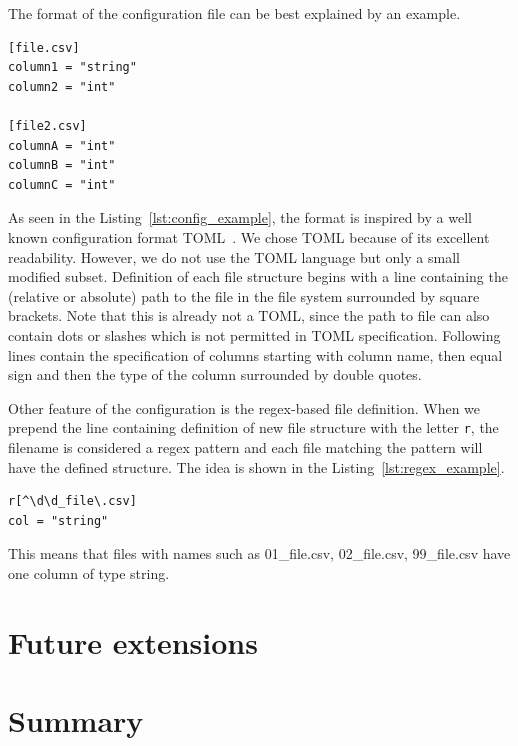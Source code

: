 The format of the configuration file can be best explained by an example.

\begin{lstlisting}[caption=An example configuration file, label={lst:config_example}, captionpos=b]
[file.csv]
column1 = "string"
column2 = "int"

[file2.csv]
columnA = "int"
columnB = "int"
columnC = "int"
\end{lstlisting}

As seen in the Listing~\ref{lst:config_example}, the format is inspired by a well known configuration format
TOML~\cite{toml_spec}.
We chose TOML because of its excellent readability.
However, we do not use the TOML language but only a small modified subset.
Definition of each file structure begins with a line containing the (relative or absolute) path to the file in the file
system surrounded by square brackets.
Note that this is already not a TOML, since the path to file can also contain dots or slashes which is not permitted in
TOML specification.
Following lines contain the specification of columns starting with column name, then equal sign and then the type of the
column surrounded by double quotes.

Other feature of the configuration is the regex-based file definition.
When we prepend the line containing definition of new file structure with the letter \verb|r|, the filename is
considered a regex pattern and each file matching the pattern will have the defined structure.
The idea is shown in the Listing~\ref{lst:regex_example}.

\begin{lstlisting}[caption=An example regex-based file definition, label={lst:regex_example}, captionpos=b]
r[^\d\d_file\.csv]
col = "string"
\end{lstlisting}

This means that files with names such as 01\_file.csv, 02\_file.csv, 99\_file.csv have one column of type string.

\section{Future extensions}

\section*{Summary}
